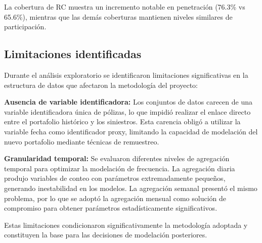 La cobertura de RC muestra un incremento notable en penetración (76.3\% vs 65.6\%), mientras que las demás coberturas mantienen niveles similares de participación.

\subsection{Limitaciones identificadas}

Durante el análisis exploratorio se identificaron limitaciones significativas en la estructura de datos que afectaron la metodología del proyecto:

\textbf{Ausencia de variable identificadora:} Los conjuntos de datos carecen de una variable identificadora única de pólizas, lo que impidió realizar el enlace directo entre el portafolio histórico y los siniestros. Esta carencia obligó a utilizar la variable fecha como identificador proxy, limitando la capacidad de modelación del nuevo portafolio mediante técnicas de remuestreo.

\textbf{Granularidad temporal:} Se evaluaron diferentes niveles de agregación temporal para optimizar la modelación de frecuencia. La agregación diaria produjo variables de conteo con parámetros extremadamente pequeños, generando inestabilidad en los modelos. La agregación semanal presentó el mismo problema, por lo que se adoptó la agregación mensual como solución de compromiso para obtener parámetros estadísticamente significativos.

Estas limitaciones condicionaron significativamente la metodología adoptada y constituyen la base para las decisiones de modelación posteriores.
